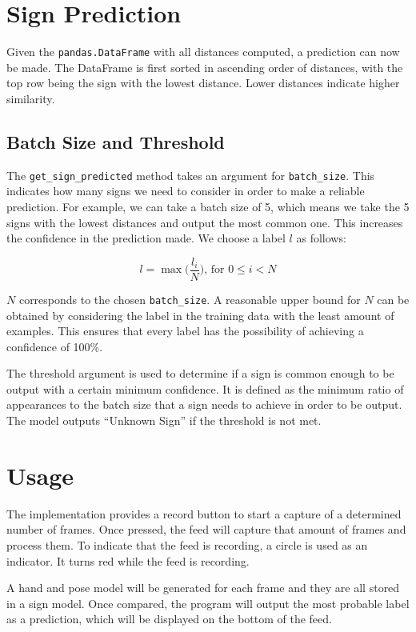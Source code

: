 \documentclass[final,dissertation.tex]{subfiles}
\begin{document}
\section{Sign Prediction}

Given the \verb|pandas.DataFrame| with all distances computed, a prediction can now be made. The DataFrame is first sorted in ascending order of distances, with the top row being the sign with the lowest distance. Lower distances indicate higher similarity.

\subsection{Batch Size and Threshold}

The \verb|get_sign_predicted| method takes an argument for \verb|batch_size|. This indicates how many signs we need to consider in order to make a reliable prediction. For example, we can take a batch size of 5, which means we take the 5 signs with the lowest distances and output the most common one. This increases the confidence in the prediction made. We choose a label $l$ as follows:

\begin{equation*}
    l = \max\Big(\frac{l_i}{N}\Big) \text{, for $0 \leq i < N$}
\end{equation*}

$N$ corresponds to the chosen \verb|batch_size|. A reasonable upper bound for $N$ can be obtained by considering the label in the training data with the least amount of examples. This ensures that every label has the possibility of achieving a confidence of 100\%.

The threshold argument is used to determine if a sign is common enough to be output with a certain minimum confidence. It is defined as the minimum ratio of appearances to the batch size that a sign needs to achieve in order to be output.
The model outputs ``Unknown Sign'' if the threshold is not met.

\section{Usage}

The implementation provides a record button to start a capture of a determined number of frames. Once pressed, the feed will capture that amount of frames and process them. To indicate that the feed is recording, a circle is used as an indicator. It turns red while the feed is recording.

A hand and pose model will be generated for each frame and they are all stored in a sign model. Once compared, the program will output the most probable label as a prediction, which will be displayed on the bottom of the feed.
\end{document}
